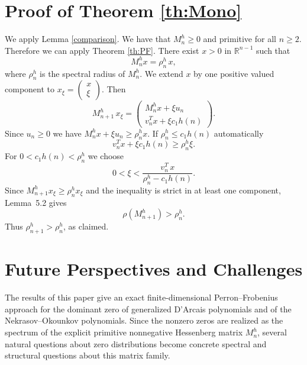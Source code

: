 \documentclass[11pt,reqno]{amsart}
\theoremstyle{plain}
\theoremstyle{remark}
\theoremstyle{definition}
\numberwithin{equation}{section}
\begin{document}
\section{\label{a:mono}Proof of Theorem \ref{th:Mono}}
We apply
Lemma \ref{comparison}. We have that $M_{n}^{h}
\geq 0$ and primitive for all $n \geq 2
$. Therefore we can apply 
Theorem \ref{th:PF}.
There exist $x>0$ in $\mathbb{R}^{n-1}$ such that
\begin{equation*}
M_{n}^{h}x=\rho _{n}^{h} \, x,
\end{equation*}
where $\rho _{n}^{h}$ is the spectral radius of $M_{n}^{h}$.
We extend $x
$ by one positive valued component to
$
{x}_{\xi
}=\left(
\begin{array}{c}
x
\\
\xi
\end{array}
\right) $. 
Then $$M_{n+1}^{h} \,
{x}_{\xi
}=\left(
\begin{array}{c}
M_{n}^{h}x
+\xi
u_{n} \\
v_{n}^{T}x
+\xi
c_{1}h\left( n\right)
\end{array}
\right).$$ Since $u_{n}\geq 0$ we have $M_{n}^{h}x
+\xi
u_{n}\geq \rho _{n}^{h} x
$.
If $\rho _{n}^{h} \leq c_{1}h\left( n\right) $ automatically
$$v_{n}^{T}x
+\xi
c_{1}h\left( n\right)
\geq \rho _{n}^{h}\xi
.$$
%
For $0<c_{1}h\left( n\right) <\rho _{n}^{h}$
we choose
$$0<\xi
<
\frac{v_{n}^{T} \, x}{\rho _{n}^{h}
-c_{1}h\left( n\right) }.$$
Since \(M_{n+1}^h x_{\xi
}\geq \rho_n^h x_{\xi
}\) and the inequality is
strict in at least one component, Lemma~5.2 gives
\[
\rho(M_{n+1}^h)>\rho_n^h.
\]
Thus \(\rho_{n+1}^h>\rho_n^h\), as claimed.



\section{\label{a:herausf}Future Perspectives and Challenges}

The results of this paper give an exact finite-dimensional Perron--Frobenius approach for the dominant zero of generalized D'Arcais polynomials and of the Nekrasov--Okounkov polynomials. Since the nonzero zeros are realized as the spectrum of the explicit primitive nonnegative Hessenberg matrix $M_n^h$, several natural questions about zero distributions become concrete spectral and structural questions about this matrix family.
\end{document}
